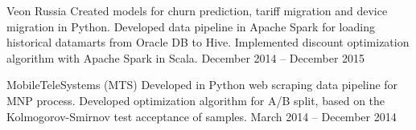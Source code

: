\documentclass[10pt,a4paper]{altacv}
\begin{document}
    {Veon Russia}
    {
        Created models for churn prediction, tariff migration and device migration in Python. \linebreak
        Developed data pipeline in Apache Spark for loading historical datamarts from Oracle DB to Hive. \linebreak
        Implemented discount optimization algorithm with Apache Spark in Scala.
    }
    {December 2014 -- December 2015}
{}

\divider

    {MobileTeleSystems (MTS)}
    {
    Developed in Python web scraping data pipeline for MNP process. \linebreak
    Developed optimization algorithm for A/B split, based on the Kolmogorov-Smirnov test acceptance of samples. 
    }
    {March 2014 -- December 2014} 
{}


\clearpage
\end{document}
